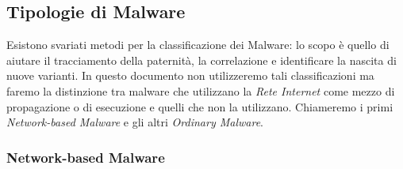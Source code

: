 \subsection{Tipologie di Malware}
Esistono svariati metodi per la classificazione dei Malware: lo scopo è quello di aiutare il tracciamento della paternità, la correlazione e identificare la nascita di nuove varianti. In questo documento non utilizzeremo tali classificazioni ma faremo la distinzione tra malware che utilizzano la \textit{Rete Internet} come mezzo di propagazione o di esecuzione e quelli che non la utilizzano. Chiameremo i primi \textit{Network-based Malware}\cite{malware} e gli altri \textit{Ordinary Malware}\cite{malware}.

\subsubsection{Network-based Malware}

